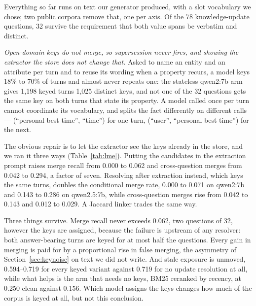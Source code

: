 \documentclass{article} %
\begin{document}
Everything so far runs on text our generator produced, with a slot vocabulary we chose; two public corpora remove that, one per axis. Of the 78 knowledge-update questions, 32 survive the requirement that both value spans be verbatim and distinct.

\emph{Open-domain keys do not merge, so supersession never fires, and showing the extractor the store does not change that.} Asked to name an entity and an attribute per turn and to reuse its wording when a property recurs, a model keys 18\% to 70\% of turns and almost never repeats one: the stateless qwen2:7b arm gives 1{,}198 keyed turns 1{,}025 distinct keys, and not one of the 32 questions gets the same key on both turns that state its property. A model called once per turn cannot coordinate its vocabulary, and splits the fact differently on different calls --- (``personal best time'', ``time'') for one turn, (``user'', ``personal best time'') for the next.

The obvious repair is to let the extractor see the keys already in the store, and we ran it three ways (Table~\ref{tab:lme}). Putting the candidates in the extraction prompt raises merge recall from 0.000 to 0.062 and cross-question merges from 0.042 to 0.294, a factor of seven. Resolving after extraction instead, which keys the same turns, doubles the conditional merge rate, 0.000 to 0.071 on qwen2:7b and 0.143 to 0.286 on qwen2.5:7b, while cross-question merges rise from 0.042 to 0.143 and 0.012 to 0.029. A Jaccard linker trades the same way.

Three things survive. Merge recall never exceeds 0.062, two questions of 32, however the keys are assigned, because the failure is upstream of any resolver: both answer-bearing turns are keyed for at most half the questions. Every gain in merging is paid for by a proportional rise in false merging, the asymmetry of Section~\ref{sec:keynoise} on text we did not write. And stale exposure is unmoved, 0.594--0.719 for every keyed variant against 0.719 for no update resolution at all, while what helps is the arm that needs no keys, BM25 reranked by recency, at 0.250 clean against 0.156. Which model assigns the keys changes how much of the corpus is keyed at all, but not this conclusion.
\end{document}
